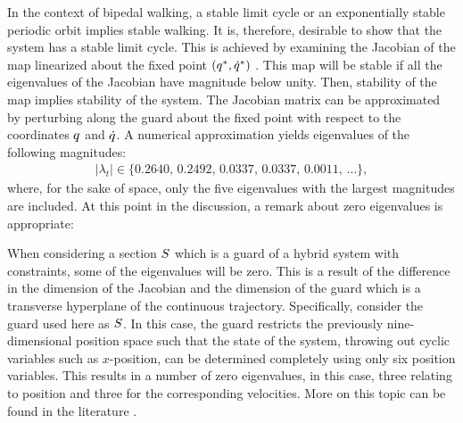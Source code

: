 In the context of bipedal walking, a stable limit cycle or an exponentially
stable periodic orbit implies stable walking.
%
It is, therefore, desirable to show that the system has a stable limit cycle.
%
This is achieved by examining the Jacobian of the \Poincare{} map linearized
about the fixed point $(q^{*}, \dot{q}^{*})$ \cite{Parker1989}.
%
This \Poincare{} map will be stable if all the eigenvalues of the Jacobian have
magnitude below unity.
%
Then, stability of the \Poincare{} map implies stability of the system.
%
The Jacobian matrix can be approximated by perturbing along the guard about the
fixed point with respect to the coordinates $q$ and $\dot{q}$.
%
A numerical approximation yields eigenvalues of the following magnitudes:
%
\begin{align}
  \label{eq:time-eigs}
  |\lambda_{t}| \in \{0.2640, \, 0.2492, \, 0.0337, \, 0.0337, \, 0.0011, \,
  \ldots\},
\end{align}
where, for the sake of space, only the five eigenvalues with the largest
magnitudes are included.
%
At this point in the discussion, a remark about zero eigenvalues is appropriate:

\begin{remark}
  When considering a \Poincare{} section $S$ which is a guard of a hybrid
  system with constraints, some of the eigenvalues will be zero.
  This is a result of the difference in the dimension of the Jacobian and the
  dimension of the guard which is a transverse hyperplane of the continuous
  trajectory.
  Specifically, consider the guard used here as $S$.
  In this  case, the guard restricts the previously nine-dimensional position
  space such that the state of the system, throwing out cyclic variables such as
  $x$-position, can be determined completely using only six position variables.
  This results in a number of zero eigenvalues, in this case, three relating to
  position and three for the corresponding velocities.
  More on this topic can be found in the literature \cite{Wendel2010}.
\end{remark}

